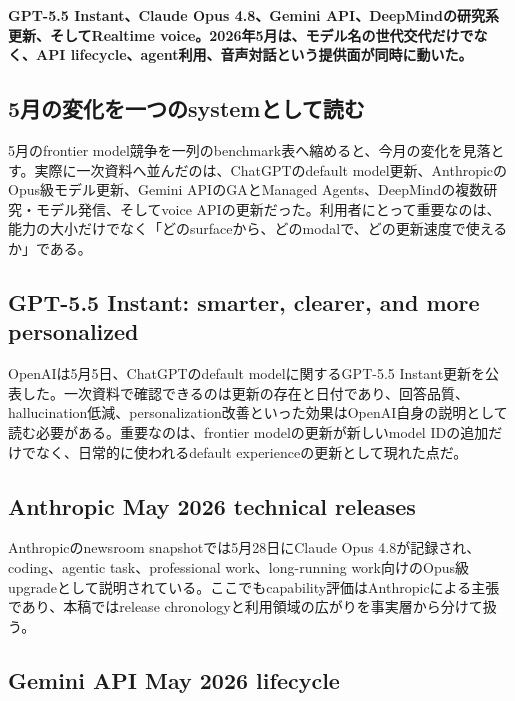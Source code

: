 \noindent\textbf{GPT-5.5 Instant、Claude Opus 4.8、Gemini API、DeepMindの研究系更新、そしてRealtime voice。2026年5月は、モデル名の世代交代だけでなく、API lifecycle、agent利用、音声対話という提供面が同時に動いた。}\autocite{src-01a8b52eee81,src-24a3c172de48,src-5c3d93bd7160,src-a24fd97eb3d0,src-dd5d9b8662f3,src-eac8dfbeb78c,src-f6aa679babd7}

\subsection{5月の変化を一つのsystemとして読む}

5月のfrontier model競争を一列のbenchmark表へ縮めると、今月の変化を見落とす。実際に一次資料へ並んだのは、ChatGPTのdefault model更新、AnthropicのOpus級モデル更新、Gemini APIのGAとManaged Agents、DeepMindの複数研究・モデル発信、そしてvoice APIの更新だった。利用者にとって重要なのは、能力の大小だけでなく「どのsurfaceから、どのmodalで、どの更新速度で使えるか」である。\autocite{src-01a8b52eee81,src-24a3c172de48,src-5c3d93bd7160,src-a24fd97eb3d0,src-dd5d9b8662f3,src-eac8dfbeb78c,src-f6aa679babd7}


\subsection{GPT-5.5 Instant: smarter, clearer, and more personalized}

OpenAIは5月5日、ChatGPTのdefault modelに関するGPT-5.5 Instant更新を公表した。一次資料で確認できるのは更新の存在と日付であり、回答品質、hallucination低減、personalization改善といった効果はOpenAI自身の説明として読む必要がある。重要なのは、frontier modelの更新が新しいmodel IDの追加だけでなく、日常的に使われるdefault experienceの更新として現れた点だ。\autocite{src-01a8b52eee81}


\subsection{Anthropic May 2026 technical releases}

Anthropicのnewsroom snapshotでは5月28日にClaude Opus 4.8が記録され、coding、agentic task、professional work、long-running work向けのOpus級upgradeとして説明されている。ここでもcapability評価はAnthropicによる主張であり、本稿ではrelease chronologyと利用領域の広がりを事実層から分けて扱う。\autocite{src-f6aa679babd7}


\subsection{Gemini API May 2026 lifecycle}

